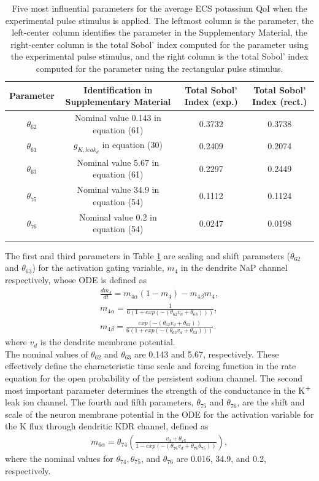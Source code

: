 \documentclass[smallextended]{svjour3}
\newcommand{\ra}[1]{\renewcommand{\arraystretch}{#1}}
\numberwithin{equation}{section}
\newcommand{\pot}{K$^{\text{\scriptsize +}}$}
\begin{document}
\begin{table}[h]
\centering
\ra{1.3}
\begin{tabular}{cccc}
\toprule
Parameter & Identification in Supplementary Material & Total Sobol' Index (exp.) & Total Sobol' Index (rect.)\\
\midrule
$\theta_{62}$ & Nominal value 0.143 in equation (61) &  0.3732 & 0.3738\\
$\theta_{61}$ & $g_{K,leak_d}$ in equation (30) & 0.2409 & 0.2074\\
$\theta_{63}$ &  Nominal value 5.67 in equation (61) &  0.2297 & 0.2449 \\
$\theta_{75}$ & Nominal value 34.9 in equation (54) & 0.1112 & 0.1124\\
$\theta_{76}$ & Nominal value 0.2 in equation (54) & 0.0247 & 0.0198\\
 \arrayrulecolor{black}\bottomrule
\end{tabular}
\caption{Five most influential parameters for the average ECS potassium QoI when the experimental pulse stimulus is applied. The leftmost column is the parameter, the left-center column identifies the parameter in the Supplementary Material, the right-center column is the total Sobol' index computed for the parameter using the experimental pulse stimulus, and the right column is the total Sobol' index computed for the parameter using the rectangular pulse stimulus.}
\label{tab:K_ECS_Mean}
\end{table}
The first and third parameters in Table \ref{tab:K_ECS_Mean} are scaling and shift parameters ($\theta_{62}$ and $\theta_{63}$) for the activation gating variable, $m_4$ in the dendrite NaP channel respectively, whose ODE is defined as 
\begin{eqnarray}\label{eqn:m4}
\frac{dm_4}{dt}=m_{4 \alpha}(1-m_4)-m_{4 \beta}m_4, \nonumber \\
m_{4 \alpha}=  \frac{1}{6(1 + exp(-(\theta_{62}  v_d + \theta_{63})))},\nonumber \\
m_{4 \beta}= \frac{exp(-(\theta_{62} v_d + \theta_{63}))}{6(1 + exp(-(\theta_{62} v_d + \theta_{63})))}.
\end{eqnarray}
where $v_d$ is the dendrite membrane potential. \\
The nominal values of $\theta_{62}$ and $\theta_{63}$ are 0.143 and 5.67, respectively. These effectively define the characteristic time scale and forcing function in the rate equation for the open  probability of the persistent sodium channel. The second most important parameter determines the strength of the  conductance in the \pot leak ion channel. The fourth and fifth parameters, $\theta_{75}$ and $\theta_{76}$, are the shift and scale of the neuron membrane potential in the ODE for the activation variable for the  K flux through dendritic KDR channel, defined as 
\begin{eqnarray}\label{eqn:m6}
m_{6  \alpha}     = \theta_{74} \left(\frac{v_d + \theta_{75}}{1 - exp(-(\theta_{76}  v_d + \theta_{76} \theta_{75}))} \right), 
\end{eqnarray}
where the nominal values for $\theta_{74}, \theta_{75}$, and $\theta_{76}$ are 0.016, 34.9, and 0.2, respectively. 
\end{document}
